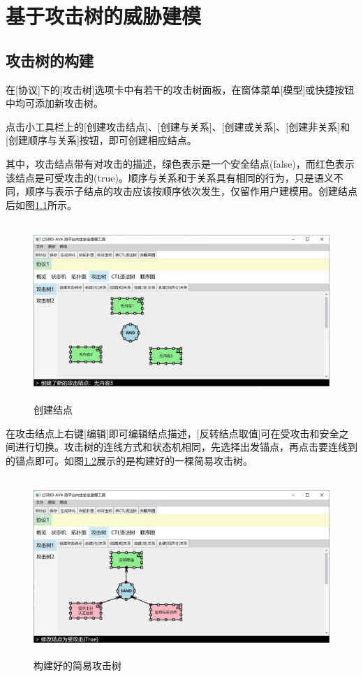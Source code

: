 \chapter{基于攻击树的威胁建模}

\section{攻击树的构建}
在[协议]下的[攻击树]选项卡中有若干的攻击树面板，在窗体菜单[模型]或快捷按钮中均可添加新攻击树。
\par
点击小工具栏上的[创建攻击结点]、[创建与关系]、[创建或关系]、[创建非关系]和[创建顺序与关系]按钮，即可创建相应结点。
\par
其中，攻击结点带有对攻击的描述，绿色表示是一个安全结点(false)，而红色表示该结点是可受攻击的(true)。顺序与关系和于关系具有相同的行为，只是语义不同，顺序与表示子结点的攻击应该按顺序依次发生，仅留作用户建模用。创建结点后如图\ref{attacktree_nodes}所示。
\begin{figure}[h]
	\centering
	\includegraphics[width=12cm,height=6.75cm]{imgs/attacktree_nodes.png}
	\caption{创建结点}
	\label{attacktree_nodes}
\end{figure}
\par
在攻击结点上右键[编辑]即可编辑结点描述，[反转结点取值]可在受攻击和安全之间进行切换。攻击树的连线方式和状态机相同，先选择出发锚点，再点击要连线到的锚点即可。如图\ref{attacktree_simple}展示的是构建好的一棵简易攻击树。
\begin{figure}[h]
	\centering
	\includegraphics[width=12cm,height=6.75cm]{imgs/attacktree_simple.png}
	\caption{构建好的简易攻击树}
	\label{attacktree_simple}
\end{figure}

